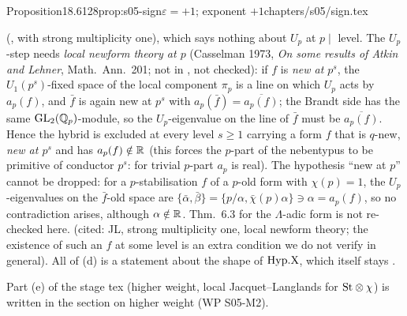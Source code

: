 \begin{quoted}{Proposition}{18.6}{128}{prop:s05-sign}{$\varepsilon=+1$; exponent $+1$}{chapters/s05/sign.tex}
\begin{enumerate}[label=(\alph*)]
  (\cite[{Ch.~III, \S14, Thm.~14.4, p.~470 (printed pagination; PDF p.~479)}]{JL}, with strong multiplicity one), which says nothing about $U_p$ at $p\mid$ level. The $U_p$-step needs \emph{local newform theory at $p$}
  (Casselman 1973, \emph{On some results of Atkin and Lehner}, Math.\ Ann.\ 201; not in , not checked): if $f$ is \emph{new at $p^s$}, the $U_1(p^s)$-fixed space of the local component $\pi_p$ is a line on which $U_p$ acts by $a_p(f)$, and $\bar f$ is again new at $p^s$ with $a_p(\bar f)=\overline{a_p(f)}$; the Brandt side has the same $\mathrm{GL}_2(\mathbb{Q}_p)$-module, so the $U_p$-eigenvalue on the line of $\bar f$ must be $\overline{a_p(f)}$. Hence the hybrid is excluded at every level $s\ge1$ carrying a form $f$ that is $q$-new, \emph{new at $p^s$} and has $a_p(f)\notin\mathbb{R}$ (this forces the $p$-part of the nebentypus to be primitive of conductor $p^s$: for trivial $p$-part $a_p$ is real). The hypothesis ``new at $p$'' cannot be dropped: for a $p$-stabilisation $f$ of a $p$-old form with $\chi(p)=1$, the $U_p$-eigenvalues on the $\bar f$-old space are $\{\bar\alpha,\bar\beta\}=\{p/\alpha,\bar\chi(p)\alpha\}\ni\alpha=a_p(f)$, so no contradiction arises, although $\alpha\notin\mathbb{R}$. Thm.~6.3 for the $\Lambda$-adic form is not re-checked here. \stpmc{} (cited: JL, strong multiplicity one, local newform theory; the existence of such an $f$ at some level is an extra condition we do not verify in general). All of (d) is a statement about the shape of
  $\mathrm{Hyp.X}$, which itself stays \sthyp.
\end{enumerate}
Part (e) of the stage tex (higher weight, local Jacquet--Langlands for $\mathrm{St}\otimes\chi$) is written in the section on higher weight
(WP S05-M2).
\end{quoted}
